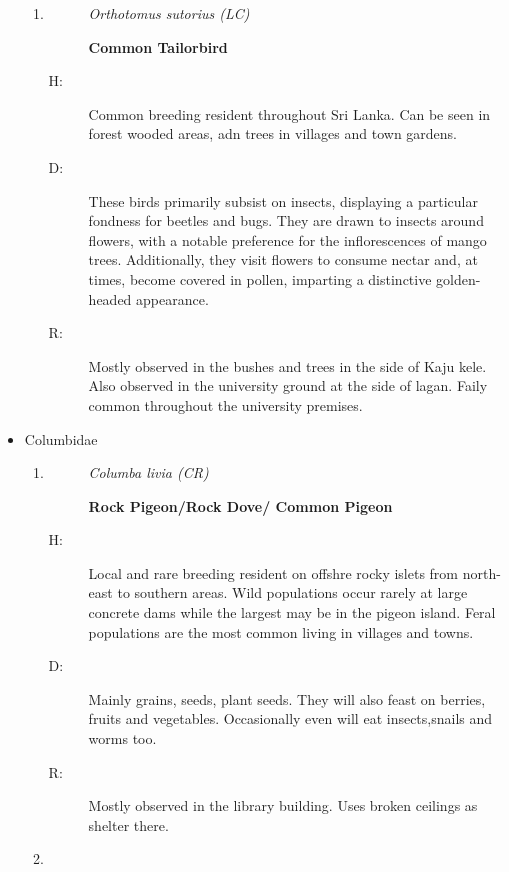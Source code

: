 \begin{itemize}
\begin{enumerate}
\item%
\begin{description}%
\item[]%
\textit{Orthotomus sutorius (LC)}%
\item[]%
\textbf{Common Tailorbird}%
\end{description}%
\begin{description}%
\item[H: ]%
Common breeding resident throughout Sri Lanka. Can be seen in forest wooded areas, adn trees in villages and town gardens.%
\item[D: ]%
These birds primarily subsist on insects, displaying a particular fondness for beetles and bugs. They are drawn to insects around flowers, with a notable preference for the inflorescences of mango trees. Additionally, they visit flowers to consume nectar and, at times, become covered in pollen, imparting a distinctive golden{-}headed appearance.%
\item[R: ]%
Mostly observed in the bushes and trees in the side of Kaju kele. Also observed in the university ground at the side of lagan. Faily common throughout the university premises.%
\end{description}%
\end{enumerate}%
\item%
Columbidae%
\begin{enumerate}%
\item%
\begin{description}%
\item[]%
\textit{Columba livia (CR)}%
\item[]%
\textbf{Rock Pigeon/Rock Dove/ Common Pigeon}%
\end{description}%
\begin{description}%
\item[H: ]%
Local and rare breeding resident on offshre rocky islets from north{-}east to southern areas. Wild populations occur rarely at large concrete dams while the largest may be in the pigeon island. Feral populations are the most common living in villages and towns. %
\item[D: ]%
Mainly grains, seeds, plant seeds. They will also feast on berries, fruits and vegetables. Occasionally even will eat insects,snails and worms too.%
\item[R: ]%
Mostly observed in the library building. Uses broken ceilings as shelter there.%
\end{description}%
\item%
\begin{description}%

\end{description}
\end{enumerate}
\end{itemize}
